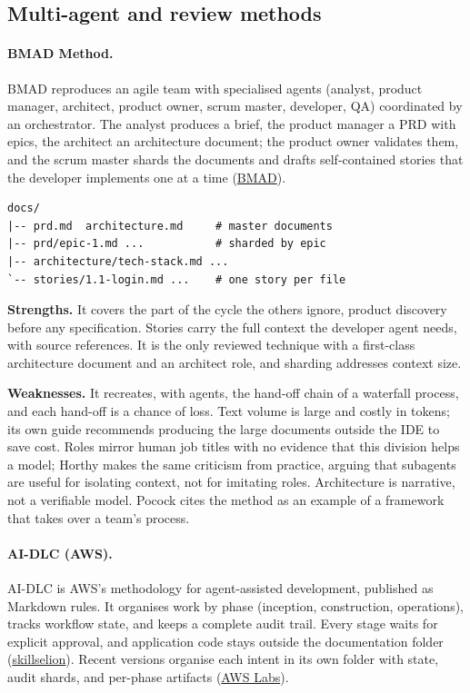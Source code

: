 \documentclass[11pt]{article}
\begin{document}
\subsection{Multi-agent and review methods}

\paragraph{BMAD Method.} BMAD reproduces an agile team with specialised agents (analyst, product manager, architect, product owner, scrum master, developer, QA) coordinated by an orchestrator. The analyst produces a brief, the product manager a PRD with epics, the architect an architecture document; the product owner validates them, and the scrum master shards the documents and drafts self-contained stories that the developer implements one at a time (\href{https://git.biohazardvfx.com/Nicholai/BMAD-METHOD/src/tag/v4.4.1/docs/bmad-workflow-guide.md}{BMAD}).

\begin{verbatim}
docs/
|-- prd.md  architecture.md     # master documents
|-- prd/epic-1.md ...           # sharded by epic
|-- architecture/tech-stack.md ...
`-- stories/1.1-login.md ...    # one story per file
\end{verbatim}

\textbf{Strengths.} It covers the part of the cycle the others ignore, product discovery before any specification. Stories carry the full context the developer agent needs, with source references. It is the only reviewed technique with a first-class architecture document and an architect role, and sharding addresses context size.

\textbf{Weaknesses.} It recreates, with agents, the hand-off chain of a waterfall process, and each hand-off is a chance of loss. Text volume is large and costly in tokens; its own guide recommends producing the large documents outside the IDE to save cost. Roles mirror human job titles with no evidence that this division helps a model; Horthy makes the same criticism from practice, arguing that subagents are useful for isolating context, not for imitating roles. Architecture is narrative, not a verifiable model. Pocock cites the method as an example of a framework that takes over a team's process.

\paragraph{AI-DLC (AWS).} AI-DLC is AWS's methodology for agent-assisted development, published as Markdown rules. It organises work by phase (inception, construction, operations), tracks workflow state, and keeps a complete audit trail. Every stage waits for explicit approval, and application code stays outside the documentation folder (\href{https://skillselion.com/skills/aws-samples/aws-kr-startup-samples/aidlc}{skillselion}). Recent versions organise each intent in its own folder with state, audit shards, and per-phase artifacts (\href{https://awslabs.github.io/aidlc-workflows/guide/14-artifacts-reference/}{AWS Labs}).
\end{document}
